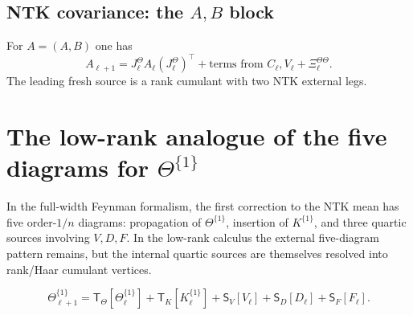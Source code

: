 \documentclass[11pt]{article}
\begin{document}
\subsection{NTK covariance: the $A,B$ block}

For $A=(A,B)$ one has
\begin{equation}
A_{\ell+1}=J^\Theta_\ell A_\ell (J^\Theta_\ell)^\top + \text{terms from }C_\ell,V_\ell +\Xi^{\Theta\Theta}_\ell.
\label{eq:A-rec}
\end{equation}
The leading fresh source is a rank cumulant with two NTK external legs.

\begin{center}
\end{center}

\section{The low-rank analogue of the five diagrams for $\Theta^{\{1\}}$}

In the full-width Feynman formalism, the first correction to the NTK mean has five order-$1/n$ diagrams: propagation of $\Theta^{\{1\}}$, insertion of $K^{\{1\}}$, and three quartic sources involving $V,D,F$.  In the low-rank calculus the external five-diagram pattern remains, but the internal quartic sources are themselves resolved into rank/Haar cumulant vertices.

\begin{equation}
\Theta^{\{1\}}_{\ell+1}
=\mathsf T_\Theta[\Theta^{\{1\}}_\ell]
+\mathsf T_K[K^{\{1\}}_\ell]
+\mathsf S_V[V_\ell]
+\mathsf S_D[D_\ell]
+\mathsf S_F[F_\ell].
\label{eq:theta-five}
\end{equation}
\end{document}
